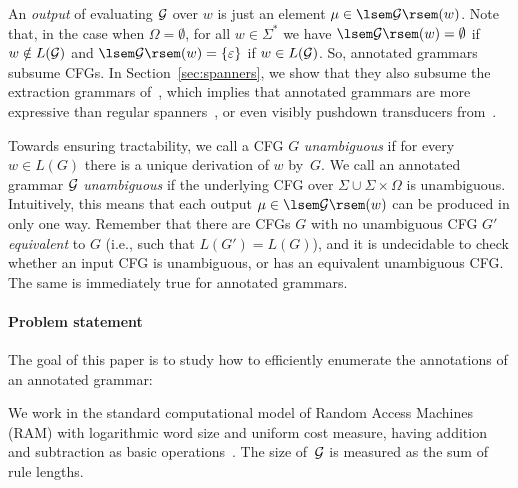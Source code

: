 An \emph{output} of evaluating $\mathcal{G}$ over $w$ is just an element $\mu \in
\sem{\cG}(w)$.
Note that, in the case when $\Omega = \emptyset$, for all $w \in \Sigma^*$ we have $\sem{\cG}(w) =
\emptyset$ if $w \notin L(\mathcal{G})$ and $\sem{\cG}(w) = \{\epsilon\}$ if $w \in
L(\mathcal{G})$. So, annotated grammars subsume CFGs. In Section~\ref{sec:spanners}, we show that they also subsume the extraction grammars of~\cite{Peterfreund21}, which implies that annotated grammars are more expressive than regular spanners~\cite{FlorenzanoRUVV18,amarilli2020constant}, or even visibly
pushdown transducers from~\cite{icdt2020nested}.

%
%
%
%
%


%

Towards ensuring tractability, we call a CFG $G$ \emph{unambiguous} if for every
$w \in L(G)$ there is a unique derivation of $w$ by~$G$. We call an annotated
grammar
$\mathcal{G}$ {\em unambiguous} if the underlying CFG over $\Sigma
\cup \Sigma\times\Omega$ is unambiguous.
%
Intuitively, this means that each output $\mu \in \sem{\cG}(w)$ can be produced
in only one way.
%
%
%
%
%
Remember that there are CFGs $G$ with no unambiguous CFG $G'$ 
\emph{equivalent} to $G$ (i.e., such that $L(G') = L(G)$), and it is undecidable to check
whether an input CFG is unambiguous, or has an equivalent unambiguous CFG. The same
is immediately true for annotated grammars.
%
%
%
%
%








\paragraph{Problem statement} 
The goal of this paper is to study how to efficiently enumerate the
annotations of an annotated grammar:
%
%
%
%
%
%
%
%
\smallskip

\begin{center}
\end{center}
\smallskip
We work in the standard computational model of Random Access Machines (RAM)
with logarithmic word size and
uniform cost measure, having addition and subtraction as basic
operations~\cite{AhoHU74}. The size of~$\mathcal{G}$ is measured as the sum of rule lengths.
%
%


